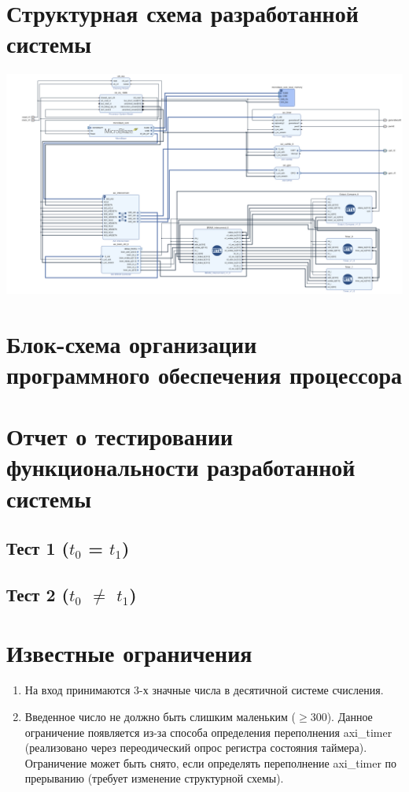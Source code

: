 \documentclass[a4paper, 12pt]{article}
\begin{document}
\section{Структурная схема разработанной системы}
\includegraphics[width=\textwidth]{scheme.png}

\section{Блок-схема организации программного обеспечения процессора}

\section{Отчет о тестировании функциональности разработанной системы}
\subsection{Тест 1 ($t_{0}$ = $t_{1}$)}
\subsection{Тест 2 ($t_{0}$ $\neq$ $t_{1}$)}

\section{Известные ограничения}
\begin{enumerate}
	\item На вход принимаются 3-х значные числа в десятичной системе счисления.
	\item Введенное число не должно быть слишким маленьким ($\geq$300). Данное ограничение появляется из-за способа определения переполнения axi\_timer (реализовано через переодический опрос регистра состояния таймера). Ограничение может быть снято, если определять переполнение axi\_timer по прерыванию (требует изменение структурной схемы).
\end{enumerate}
\end{document}
